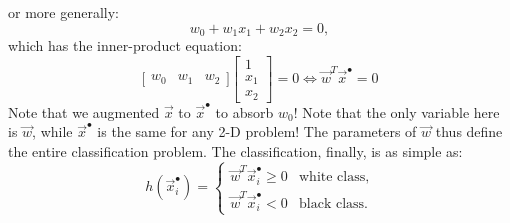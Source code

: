 \documentclass{article}
\begin{document}
or more generally:
\begin{equation}
    w_0 + w_1x_1 + w_2x_2 = 0,
\end{equation}
which has the inner-product equation:
\begin{equation}
    \Big[\begin{array}{ccc} w_0 & w_1 & w_2 \end{array} \Big] \left[ \begin{array}{c} 1 \\ x_1 \\ x_2 \end{array} \right] = 0 \Longleftrightarrow \vec{w}^T\vec{x}^\bullet = 0
\end{equation}
Note that we augmented $\vec{x}$ to $\vec{x}^\bullet$ to absorb $w_0$! Note that the only variable here is $\vec{w}$, while $\vec{x}^\bullet$ is the same for any 2-D problem! The parameters of $\vec{w}$ thus define the entire classification problem. The classification, finally, is as simple as:
\begin{equation}
    h(\vec{x}_i^\bullet) = \begin{cases} \vec{w}^T\vec{x}_i^\bullet\geq 0 & \text{white class},\\ \vec{w}^T\vec{x}_i^\bullet<0 & \text{black class}.\end{cases}
\end{equation}

\end{document}
